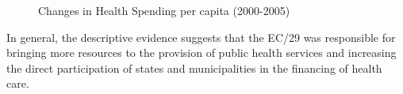 \begin{figure}[h]
\begin{center}
    \caption{Changes in Health Spending per capita (2000-2005)}
\end{center}
\end{figure}

In general, the descriptive evidence suggests that the EC/29 was responsible for bringing more resources to the provision of public health services and increasing the direct participation of states and municipalities in the financing of health care.
